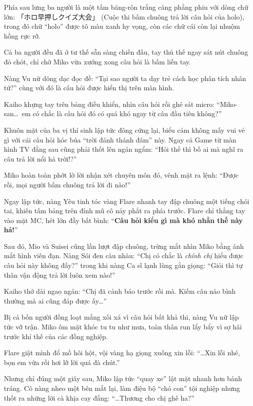 \documentclass[../main.tex]{subfiles}
\begin{document}

Phía sau lưng ba người là một tấm băng-rôn trắng căng phẳng phiu với dòng chữ lớn: 「ホロ早押しクイズ大会」 (Cuộc thi bấm chuông trả lời câu hỏi của holo), trong đó chữ ``holo'' được tô màu xanh hy vọng, còn các chữ cái còn lại nhuộm hồng rực rỡ.

Cả ba người đều đã ở tư thế sẵn sàng chiến đấu, tay thủ thế ngay sát nút chuông đỏ chót, chỉ chờ Miko vừa xướng xong câu hỏi là bấm liền tay.

Nàng Vu nữ dõng dạc đọc đề: ``Tại sao người ta dạy trẻ cách học phân tích nhân tử?'' cùng với đó là câu hỏi được hiển thị trên màn hình.

Kaiho khựng tay trên bảng điều khiển, nhìn câu hỏi rồi ghé sát micro: ``Miko-san\dots\ em có chắc là câu hỏi đó có quá khó ngay từ câu đầu tiên không?''

Khuôn mặt của ba vị thí sinh lập tức đông cứng lại, biểu cảm không mấy vui vẻ gì với cái câu hỏi hóc búa ``trời đánh thánh đâm'' này. Ngay cả Game từ màn hình TV đằng sau cũng phải thốt lên ngán ngẩm: ``Hỏi thế thì bố ai mà nghĩ ra câu trả lời nổi hả trời!?''

Miko hoàn toàn phớt lờ lời nhận xét chuyên môn đó, vênh mặt ra lệnh: ``Được rồi, mọi người bấm chuông trả lời đi nào!''

Ngay lập tức, nàng Yêu tinh tóc vàng Flare nhanh tay đập chuông một tiếng chói tai, khiến tấm bảng trên đỉnh mũ cô nảy phắt ra phía trước. Flare chỉ thẳng tay vào mặt MC, hét lớn đầy bất bình: ``\textbf{Câu hỏi kiểu gì mà khó nhằn thế này hả!}''

Sau đó, Mio và Suisei cũng lần lượt đập chuông, trừng mắt nhìn Miko bằng ánh mắt hình viên đạn. Nàng Sói đen càu nhàu: ``Chị có chắc là \emph{chính chị} hiểu được câu hỏi này không đấy?'' trong khi nàng Ca sĩ lạnh lùng gằn giọng: ``Giỏi thì tự thân vận động trả lời luôn xem nào!''

Kaiho thở dài ngao ngán: ``Chị đã cảnh báo trước rồi mà. Kiếm câu nào bình thường mà ai cũng đáp được ấy\dots''

Bị cả bốn người đồng loạt mắng xối xả vì câu hỏi bất khả thi, nàng Vu nữ lập tức vỡ trận. Miko ôm mặt khóc tu tu như mưa, toàn thân run lẩy bẩy vì sợ hãi trước khí thế của các đồng nghiệp.


Flare giật mình đổ mồ hôi hột, vội vàng hạ giọng xuống xin lỗi: ``\dots Xin lỗi nhé, bọn em vừa rồi hơi lỡ lời quá đà chút.''

Nhưng chỉ đúng một giây sau, Miko lập tức ``quay xe'' lật mặt nhanh hơn bánh tráng. Cô nàng nheo một bên mắt lại, làm điệu bộ ``chó con'' tội nghiệp nhưng thốt ra những lời cà khịa cay đắng: ``\dots Thương cho chị ghê ha?''
\end{document}
